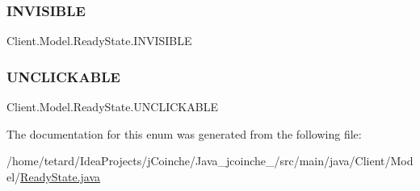 \subsubsection{\texorpdfstring{I\+N\+V\+I\+S\+I\+B\+LE}{INVISIBLE}}
{\footnotesize\ttfamily Client.\+Model.\+Ready\+State.\+I\+N\+V\+I\+S\+I\+B\+LE}

\mbox{\label{enumClient_1_1Model_1_1ReadyState_acd3251fb20416d6aa8ea238102f3d9f2}} 
\subsubsection{\texorpdfstring{U\+N\+C\+L\+I\+C\+K\+A\+B\+LE}{UNCLICKABLE}}
{\footnotesize\ttfamily Client.\+Model.\+Ready\+State.\+U\+N\+C\+L\+I\+C\+K\+A\+B\+LE}



The documentation for this enum was generated from the following file\+:\begin{DoxyCompactItemize}
\item 
/home/tetard/\+Idea\+Projects/j\+Coinche/\+Java\+\_\+jcoinche\+\_/src/main/java/\+Client/\+Model/\mbox{\hyperlink{ReadyState_8java}{Ready\+State.\+java}}\end{DoxyCompactItemize}
